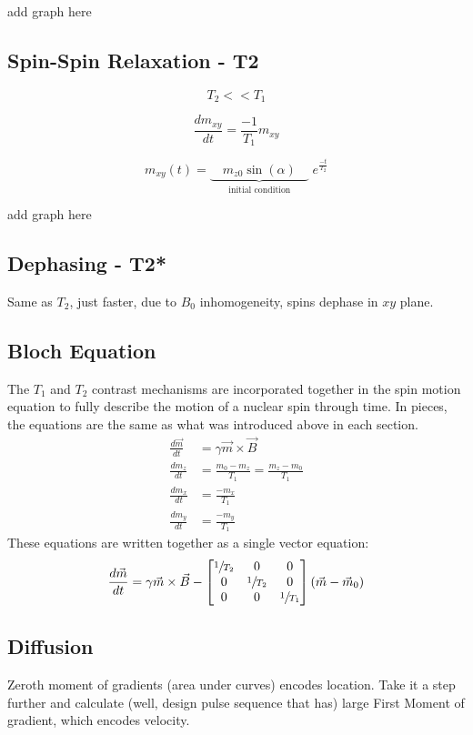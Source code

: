 add graph here


\subsection{Spin-Spin Relaxation - T2}
\begin{equation}
T_2 << T_1
\end{equation}

\begin{equation}
\frac{dm_{xy}}{dt}= \frac{-1}{T_1}m_{xy}
\end{equation}

\begin{equation}
m_{xy}(t) = \underset{\text{initial condition}}{\underbrace{\quad m_{z0}\sin\left(\alpha\right)\quad}}\; e^{\frac{-t}{T_2}}
\end{equation}

add graph here

\subsection{Dephasing - T2*}
Same as $T_2$, just faster, due to $B_0$ inhomogeneity, spins dephase in $xy$ plane.
\subsection{Bloch Equation}
The $T_1$ and $T_2$ contrast mechanisms are incorporated together in the spin motion equation to fully describe the motion of a nuclear spin through time. In pieces, the equations are the same as what was introduced above in each section.
\begin{align}
\frac{d\vec{m}}{dt} &= \gamma \vec{m} \times \vec{B}  \\
\frac{dm_z}{dt}&= \frac{m_0-m_z}{T_1} =\frac{m_z-m_0}{T_1} \\
\frac{dm_{x}}{dt}&= \frac{-m_{x}}{T_1}  \\
\frac{dm_{y}}{dt}&= \frac{-m_{y}}{T_1}
\end{align}
These equations are written together as a single vector equation:
\begin{equation}
\frac{d\vec{m}}{dt} = \gamma \vec{m} \times \vec{B} -\left[\begin{matrix}\sfrac{1}{T_2}&0&0\\0&\sfrac{1}{T_2}&0\\0&0&\sfrac{1}{T_1}\end{matrix}\right] \left(\vec{m}-\vec{m}_0\right)
\end{equation}
\subsection{Diffusion}
Zeroth moment of gradients (area under curves) encodes location. Take it a step further and calculate (well, design pulse sequence that has) large First Moment of gradient, which encodes velocity. 
